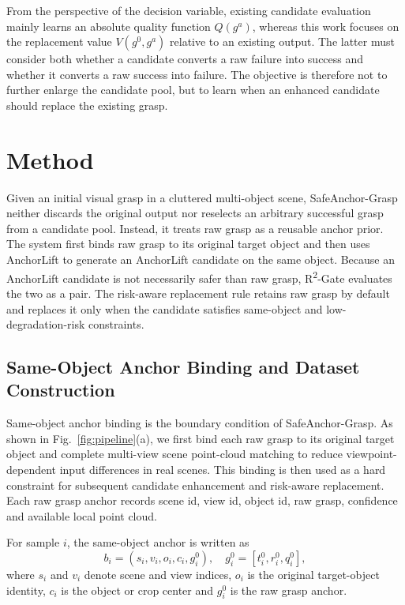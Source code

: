 \documentclass[lettersize,journal]{IEEEtran}
\begin{document}
From the perspective of the decision variable, existing candidate evaluation mainly learns an absolute quality function $Q(g^{a})$, whereas this work focuses on the replacement value $V(g^{0},g^{a})$ relative to an existing output. The latter must consider both whether a candidate converts a raw failure into success and whether it converts a raw success into failure. The objective is therefore not to further enlarge the candidate pool, but to learn when an enhanced candidate should replace the existing grasp.

\section{Method}

Given an initial visual grasp in a cluttered multi-object scene, SafeAnchor-Grasp neither discards the original output nor reselects an arbitrary successful grasp from a candidate pool. Instead, it treats raw grasp as a reusable anchor prior. The system first binds raw grasp to its original target object and then uses AnchorLift to generate an AnchorLift candidate on the same object. Because an AnchorLift candidate is not necessarily safer than raw grasp, R\textsuperscript{2}-Gate evaluates the two as a pair. The risk-aware replacement rule retains raw grasp by default and replaces it only when the candidate satisfies same-object and low-degradation-risk constraints.

\subsection{Same-Object Anchor Binding and Dataset Construction}

Same-object anchor binding is the boundary condition of SafeAnchor-Grasp. As shown in Fig.~\ref{fig:pipeline}(a), we first bind each raw grasp to its original target object and complete multi-view scene point-cloud matching to reduce viewpoint-dependent input differences in real scenes. This binding is then used as a hard constraint for subsequent candidate enhancement and risk-aware replacement. Each raw grasp anchor records scene id, view id, object id, raw grasp, confidence and available local point cloud.

For sample $i$, the same-object anchor is written as
\setcounter{equation}{0}
\begin{equation}
b_i = (s_i, v_i, o_i, c_i, g_i^{0}),
\quad
g_i^{0}=[t_i^{0}, r_i^{0}, q_i^{0}],
\label{eq:anchor_binding}
\end{equation}
where $s_i$ and $v_i$ denote scene and view indices, $o_i$ is the original target-object identity, $c_i$ is the object or crop center and $g_i^{0}$ is the raw grasp anchor.
\end{document}
